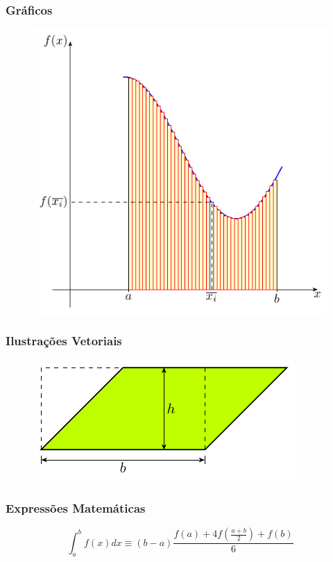 \documentclass[aspectratio=169]{beamer}
\begin{document}
\begin{frame}\frametitle{Gráficos}
  \begin{figure}[h]
    \centering
    \includegraphics[height=0.6\paperheight]{img/integral}
  \end{figure}
\end{frame}

\begin{frame}\frametitle{Ilustrações Vetoriais}
  \begin{figure}[h]
    \centering
    \includegraphics[height=0.4\paperheight]{img/vetorial}
  \end{figure}
\end{frame}

\begin{frame}\frametitle{Expressões Matemáticas}
\[
\int_a^b f(x)dx \equiv (b - a)\frac{f(a) + 4f(\frac{a+b}{2}) + f(b)}{6}
\]
\end{frame}
\end{document}
